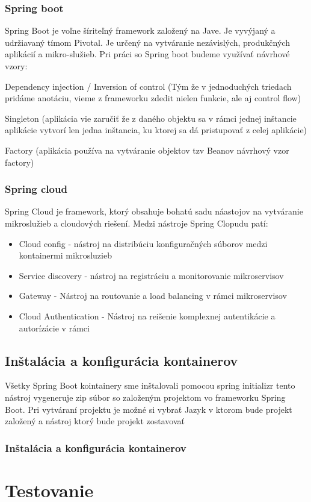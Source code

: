 

\subsubsection{Spring boot}
\noindent Spring Boot je voľne šíriteľný framework založený na Jave. Je vyvýjaný a udržiavaný tímom Pivotal. Je určený na vytváranie nezávislých, produkčných aplikácií a mikro-služieb. 
Pri práci so Spring boot budeme využívať návrhové vzory:

Dependency injection / Inversion of control (Tým že v jednoduchých triedach pridáme anotáciu, vieme z frameworku zdedit nielen funkcie, ale aj control flow) 

Singleton (aplikácia vie zaručiť že z daného objektu sa v rámci jednej inštancie aplikácie vytvorí len jedna inštancia, ku ktorej sa dá pristupovať z celej aplikácie)

Factory (aplikácia používa na vytváranie objektov tzv Beanov návrhový vzor factory)



\subsubsection{Spring cloud}
\noindent Spring Cloud je framework, ktorý obsahuje bohatú sadu náastojov na vytváranie mikroslužieb a cloudových riešení. Medzi nástroje Spring Clopudu patí: 
\begin{itemize}
\item Cloud config - nástroj na distribúciu konfiguračných súborov medzi kontainermi mikrosluzieb
\item Service discovery - nástroj na registráciu a monitorovanie mikroservisov
\item Gateway - Nástroj na routovanie a load balancing v rámci mikroservisov
\item Cloud Authentication - Nástroj na reišenie komplexnej autentikácie a autorízácie v rámci
\end{itemize}

 
 
\subsection{Inštalácia a konfigurácia kontainerov}
\noindent Všetky Spring Boot kointainery sme inštalovali pomocou spring initializr
tento nástroj vygeneruje zip súbor so založeným projektom vo frameworku Spring Boot. Pri vytváraní projektu je možné si vybrať Jazyk v ktorom bude projekt založený a nástroj ktorý bude projekt zostavovať %
\subsubsection{Inštalácia a konfigurácia kontainerov}




\section{Testovanie}




\section{}

